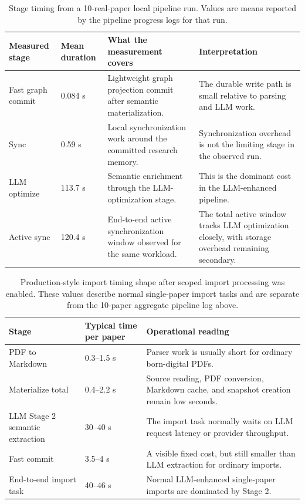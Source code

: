 \documentclass[11pt]{article}
\begin{document}
\begin{table}[t]
\centering
\caption{Stage timing from a 10-real-paper local pipeline run. Values are means reported by the pipeline progress logs for that run.}
\label{tab:local-stage-timing}
\footnotesize
\begin{tabularx}{\linewidth}{@{}l l Y Y@{}}
\toprule
Measured stage & Mean duration & What the measurement covers & Interpretation \\
\midrule
Fast graph commit & 0.084 s & Lightweight graph projection commit after semantic materialization. & The durable write path is small relative to parsing and LLM work. \\
Sync & 0.59 s & Local synchronization work around the committed research memory. & Synchronization overhead is not the limiting stage in the observed run. \\
LLM optimize & 113.7 s & Semantic enrichment through the LLM-optimization stage. & This is the dominant cost in the LLM-enhanced pipeline. \\
Active sync & 120.4 s & End-to-end active synchronization window observed for the same workload. & The total active window tracks LLM optimization closely, with storage overhead remaining secondary. \\
\bottomrule
\end{tabularx}
\end{table}

\begin{table}[t]
\centering
\caption{Production-style import timing shape after scoped import processing was enabled. These values describe normal single-paper import tasks and are separate from the 10-paper aggregate pipeline log above.}
\label{tab:local-import-timing-shape}
\footnotesize
\begin{tabularx}{\linewidth}{@{}l l Y@{}}
\toprule
Stage & Typical time per paper & Operational reading \\
\midrule
PDF to Markdown & 0.3--1.5 s & Parser work is usually short for ordinary born-digital PDFs. \\
Materialize total & 0.4--2.2 s & Source reading, PDF conversion, Markdown cache, and snapshot creation remain low seconds. \\
LLM Stage 2 semantic extraction & 30--40 s & The import task normally waits on LLM request latency or provider throughput. \\
Fast commit & 3.5--4 s & A visible fixed cost, but still smaller than LLM extraction for ordinary imports. \\
End-to-end import task & 40--46 s & Normal LLM-enhanced single-paper imports are dominated by Stage 2. \\
\bottomrule
\end{tabularx}
\end{table}
\end{document}
